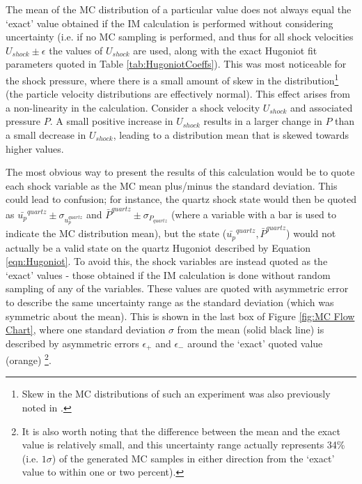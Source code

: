 The mean of the MC distribution of a particular value does not always equal the `exact' value obtained if the IM calculation is performed without considering uncertainty (i.e. if no MC sampling is performed, and thus for all shock velocities $U_{shock} \pm \epsilon$ the values of $U_{shock}$ are used, along with the exact Hugoniot fit parameters quoted in Table \ref{tab:HugoniotCoeffs}). This was most noticeable for the shock pressure, where there is a small amount of skew in the distribution\footnote{Skew in the MC distributions of such an experiment was also previously noted in \cite{Root2013}.} (the particle velocity distributions are effectively normal). This effect arises from a non-linearity in the calculation. Consider a shock velocity $U_{shock}$ and associated pressure $P$. A small positive increase in $U_{shock}$ results in a larger change in $P$ than a small decrease in $U_{shock}$, leading to a distribution mean that is skewed towards higher values.

The most obvious way to present the results of this calculation would be to quote each shock variable as the MC mean plus/minus the standard deviation. This could lead to confusion; for instance, the quartz shock state would then be quoted as $\bar{u_p}^{quartz} \pm \sigma_{u_p^{quartz}}$ and $\bar{P}^{quartz} \pm \sigma_{P_{quartz}}$ (where a variable with a bar is used to indicate the MC distribution mean), but the state ($\bar{u_p}^{quartz}, \bar{P}^{quartz}$) would not actually be a valid state on the quartz Hugoniot described by Equation \ref{eqn:Hugoniot}. To avoid this, the shock variables are instead quoted as the `exact' values - those obtained if the IM calculation is done without random sampling of any of the variables. These values are quoted with asymmetric error to describe the same uncertainty range as the standard deviation (which was symmetric about the mean). This is shown in the last box of Figure \ref{fig:MC Flow Chart}, where one standard deviation $\sigma$ from the mean (solid black line) is described by asymmetric errors $\epsilon_+$ and $\epsilon_-$ around the `exact' quoted value (orange) \footnote{It is also worth noting that the difference between the mean and the exact value is relatively small, and this uncertainty range actually represents 34\% (i.e. $1 \sigma$) of the generated MC samples in either direction from the `exact' value to within one or two percent).}.

